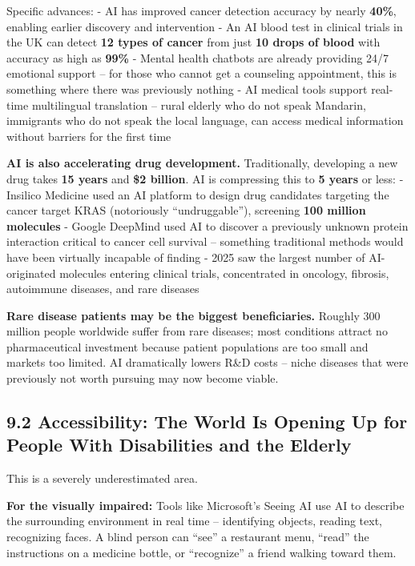 Specific advances: - AI has improved cancer detection accuracy by nearly
\textbf{40\%}, enabling earlier discovery and intervention - An AI blood
test in clinical trials in the UK can detect \textbf{12 types of cancer}
from just \textbf{10 drops of blood} with accuracy as high as
\textbf{99\%} - Mental health chatbots are already providing 24/7
emotional support -- for those who cannot get a counseling appointment,
this is something where there was previously nothing - AI medical tools
support real-time multilingual translation -- rural elderly who do not
speak Mandarin, immigrants who do not speak the local language, can
access medical information without barriers for the first time

\textbf{AI is also accelerating drug development.} Traditionally,
developing a new drug takes \textbf{15 years} and \textbf{\$2 billion}.
AI is compressing this to \textbf{5 years} or less: - Insilico Medicine
used an AI platform to design drug candidates targeting the cancer
target KRAS (notoriously ``undruggable''), screening \textbf{100 million
molecules} - Google DeepMind used AI to discover a previously unknown
protein interaction critical to cancer cell survival -- something
traditional methods would have been virtually incapable of finding -
2025 saw the largest number of AI-originated molecules entering clinical
trials, concentrated in oncology, fibrosis, autoimmune diseases, and
rare diseases

\textbf{Rare disease patients may be the biggest beneficiaries.} Roughly
300 million people worldwide suffer from rare diseases; most conditions
attract no pharmaceutical investment because patient populations are too
small and markets too limited. AI dramatically lowers R\&D costs --
niche diseases that were previously not worth pursuing may now become
viable.

\subsection{9.2 Accessibility: The World Is Opening Up for People With
Disabilities and the
Elderly}\label{accessibility-the-world-is-opening-up-for-people-with-disabilities-and-the-elderly}

This is a severely underestimated area.

\textbf{For the visually impaired:} Tools like Microsoft's Seeing AI use
AI to describe the surrounding environment in real time -- identifying
objects, reading text, recognizing faces. A blind person can ``see'' a
restaurant menu, ``read'' the instructions on a medicine bottle, or
``recognize'' a friend walking toward them.

